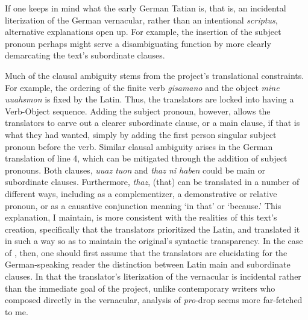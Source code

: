 If one keeps in mind what the early German Tatian is, that is, an incidental literization of the German vernacular, rather than an intentional \textit{scriptus}, alternative explanations open up. For example, the insertion of the subject pronoun perhaps might serve a disambiguating function by more clearly demarcating the text’s subordinate clauses.


\begin{sloppypar}
\noindent Much of the clausal ambiguity stems from the project’s translational constraints. For example, the ordering of the finite verb \textit{gisamano} and the object \textit{mine uuahsmon} is fixed by the Latin. Thus, the translators are locked into having a Verb-Object sequence. Adding the subject pronoun, however, allows the translators to carve out a clearer subordinate clause, or a main clause, if that is what they had wanted, simply by adding the first person singular subject pronoun before the verb. Similar clausal ambiguity arises in the German translation of line 4, which can be mitigated through the addition of subject pronouns. Both clauses, \textit{uuaz tuon} and \textit{thaz ni haben} could be main or subordinate clauses. Furthermore, \textit{thaz}, (that) can be translated in a number of different ways, including as a complementizer, a demonstrative or relative pronoun, or as a causative conjunction meaning ‘in that’ or ‘because.’ This explanation, I maintain, is more consistent with the realities of this text’s creation, specifically that the translators prioritized the Latin, and translated it in such a way so as to maintain the original’s syntactic transparency. In the case of , then, one should first assume that the translators are elucidating for the German-speaking reader the distinction between Latin main and subordinate clauses. In that the translator’s literization of the vernacular is incidental rather than the immediate goal of the project, unlike contemporary writers who composed directly in the vernacular,  analysis of \textit{pro}{}-drop seems more far-fetched to me.
\end{sloppypar}

